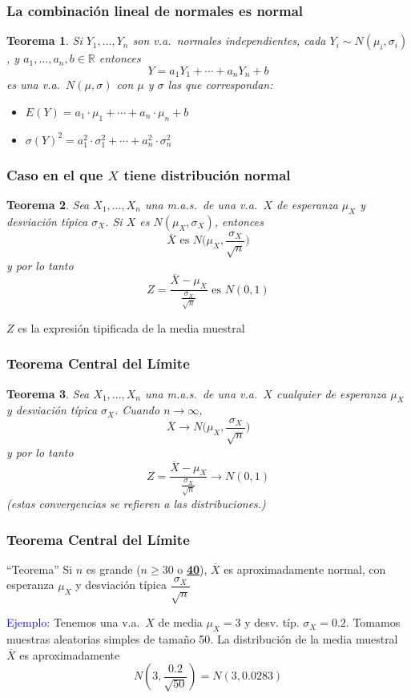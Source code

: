 \documentclass[12pt,t]{beamer}
\newcommand{\blue}[1]{\textcolor{blue}{#1}}
\renewcommand{\emph}[1]{{\color{red}#1}}
\newcommand{\RR}{\mathbb{R}}
\renewcommand{\geq}{\geqslant}
\theoremstyle{plain}
\newtheorem{teorema}{Teorema}
\theoremstyle{definition}
\begin{document}
\begin{frame}
\frametitle{La combinación lineal de normales es normal}
\begin{teorema}
Si $Y_1,\ldots,Y_n$ son v.a.\ normales independientes, cada $Y_i\sim N(\mu_i,\sigma_i)$, y $a_1,\ldots,a_n,b\in \RR$ entonces
$$
Y=a_1Y_1+\cdots+a_nY_n+b
$$
es una v.a.\ $N(\mu,\sigma)$ con $\mu$ y $\sigma$ las que correspondan:
\begin{itemize}
\item $E(Y)=a_1\cdot\mu_1+\cdots+a_n\cdot\mu_n+b$
\medskip

\item $\sigma(Y)^2=a_1^2\cdot\sigma_1^2+\cdots+a_n^2\cdot\sigma_n^2$
\end{itemize}
\end{teorema}
\end{frame}




\begin{frame}
\frametitle{Caso  en el que $X$  tiene distribución normal}
\begin{teorema}
Sea $X_1,\ldots, X_n$ una m.a.s.\ de una v.a.\ $X$ de esperanza $\mu_X$ y desviación típica $\sigma_X$.
Si $X$ es $N(\mu_X,\sigma_X)$, entonces
$$
\overline{X}\mbox{ es }N\Big(\mu_X,\frac{\sigma_X}{\sqrt{n}}\Big)
$$
y por lo tanto
$$
Z=\frac{\overline{X}-\mu_X}{\frac{\sigma_X}{\sqrt{n}}}\mbox{ es }N(0,1)
$$
\end{teorema}

$Z$ es la \emph{expresión tipificada} de la media muestral

\end{frame}




\begin{frame}
\frametitle{Teorema Central del Límite}
\begin{teorema}
Sea $X_1,\ldots, X_n$ una m.a.s.\ de una v.a.\ $X$ \emph{cualquier} de esperanza $\mu_X$ y desviación típica $\sigma_X$. Cuando $n\to \infty$, 
$$
\overline{X}\to N\Big(\mu_X,\frac{\sigma_X}{\sqrt{n}}\Big)
$$
y por lo tanto
$$
Z=\frac{\overline{X}-\mu_X}{\frac{\sigma_X}{\sqrt{n}}}\to N(0,1)
$$
(estas convergencias se refieren a las distribuciones.)
\end{teorema}
\end{frame}



\begin{frame}
\frametitle{Teorema Central del Límite}

\begin{block}{``Teorema''}
Si $n$ es grande (\emph{$n\geq 30$ o \underline{\textbf{40}}}), 
$\overline{X}$ es aproximadamente normal, con esperanza  $\mu_X$ y desviación típica  $\dfrac{\sigma_X}{\sqrt{n}}$
\end{block}
\bigskip

\blue{Ejemplo:} Tenemos una v.a.\ $X$ de media $\mu_X=3$ y desv. típ. 
$\sigma_X=0.2$. Tomamos  muestras aleatorias  simples de tamaño 50. La distribución de la media muestral $\overline{X}$ es aproximadamente
$$
N\left(3,\frac{0.2}{\sqrt{50}}\right)=N(3,0.0283)
$$
\end{frame}
\end{document}
